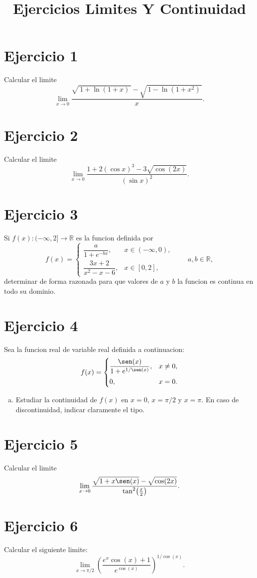 \documentclass[12pt]{article}
\title{Ejercicios Limites Y Continuidad}
\author{}
\begin{document}
\maketitle
\section*{Ejercicio 1}
Calcular el limite
\[
\lim_{x\to 0}\frac{\sqrt{\,1+\ln(1+x)\,}-\sqrt{\,1-\ln(1+x^2)\,}}{x}.
\]
\section*{Ejercicio 2}
Calcular el limite
\[
\lim_{x\to 0}\frac{1+2(\cos x)^3-3\sqrt{\cos(2x)}}{(\sin x)^2}.
\]
\section*{Ejercicio 3}
Si $f(x):(-\infty,2]\to \mathbb{R}$ es la funcion definida por
\[
f(x)=
\begin{cases}
\dfrac{a}{1+e^{-bx}}, & x\in(-\infty,0),\\[8pt]
\dfrac{3x+2}{x^2-x-6}, & x\in[0,2],
\end{cases}
\qquad a,b\in\mathbb{R},
\]
determinar de forma razonada para que valores de $a$ y $b$ la funcion es continua en todo su dominio.
\section*{Ejercicio 4}
Sea la funcion real de variable real definida a continuacion:
\[
f(x)=
\begin{cases}
\dfrac{\sen(x)}{1+e^{1/\sen(x)}}, & x\ne 0,\\[8pt]
0, & x=0.
\end{cases}
\]
\begin{enumerate}[a)]
\item Estudiar la continuidad de $f(x)$ en $x=0$, $x=\pi/2$ y $x=\pi$. En caso de discontinuidad, indicar claramente el tipo.
\end{enumerate}
\section*{Ejercicio 5}
Calcular el limite
\[
\lim_{x\to 0}\frac{\sqrt{1+x\sen(x)}-\sqrt{\cos(2x)}}{\tan^2\!\left(\frac{x}{2}\right)}.
\]
\section*{Ejercicio 6}
Calcular el siguiente limite:
\[
\lim_{x\to \pi/2}\left(\frac{e^x\cos(x)+1}{e^{\cos(x)}}\right)^{1/\cos(x)}.
\]
\end{document}
